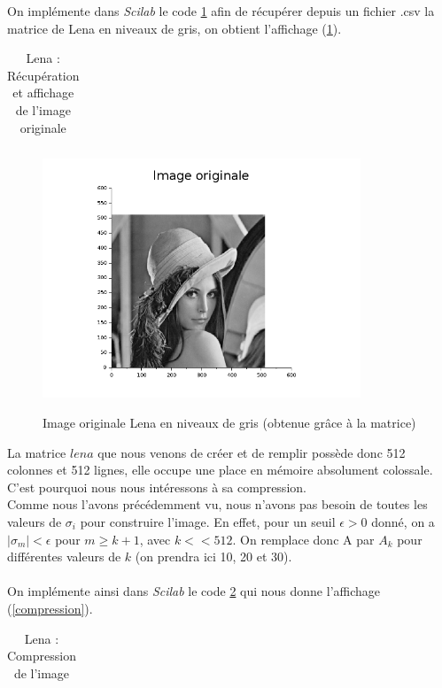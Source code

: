 \documentclass[a4paper,10pt]{report}
\begin{document}
On implémente dans \textit{Scilab} le code \ref{lena_originale} afin de récupérer depuis un fichier .csv la matrice de Lena en niveaux de gris, on obtient l'affichage (\ref{originale}).
\begin{table}[H]
\caption{Lena : Récupération et affichage de l'image originale}
\begin{tabular}{l}

\label{lena_originale}
\end{tabular}
\end{table}

\begin{figure}[H]
\centering
\caption{Image originale Lena en niveaux de gris (obtenue grâce à la matrice)}
\includegraphics[width=9.5cm]{lena_originale.png}
\label{originale}
\end{figure}

La matrice $lena$ que nous venons de créer et de remplir possède donc 512 colonnes et 512 lignes, elle occupe une place en mémoire absolument colossale. C'est pourquoi nous nous intéressons à sa compression. \\
\indent Comme nous l'avons précédemment vu, nous n'avons pas besoin de toutes les valeurs de $\sigma_i$ pour construire l'image. En effet, pour un seuil $\epsilon>0$ donné, on a $|\sigma_m|<\epsilon$ pour $m\geq k+1$, avec $k<<512$. On remplace donc A par $A_k$ pour différentes valeurs de $k$ (on prendra ici 10, 20 et 30). \\ \\

On implémente ainsi dans \textit{Scilab} le code \ref{lena} qui nous donne l'affichage (\ref{compression}).
\begin{table}[H]
\caption{Lena : Compression de l'image}
\begin{tabular}{l}

\label{lena}
\end{tabular}
\end{table}
\end{document}
